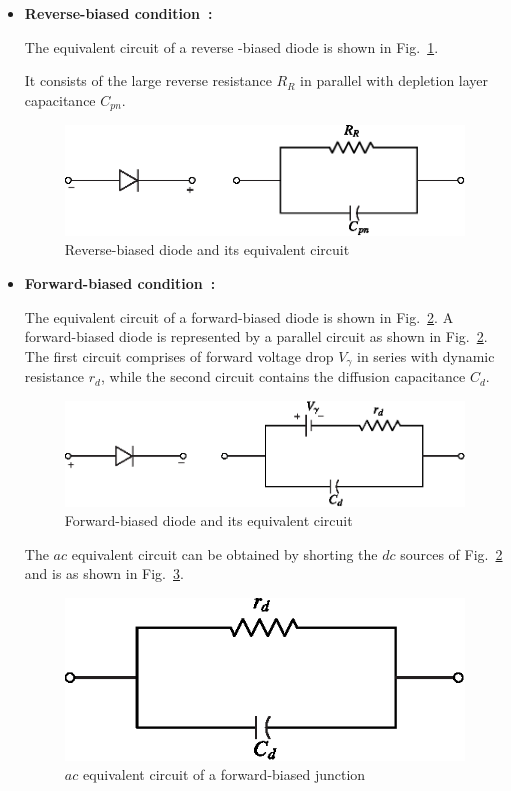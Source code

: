 \begin{itemize}
\item {\bf Reverse-biased condition~:}

The equivalent circuit of a reverse -biased diode is shown in
Fig.~\ref{fig1.18}.

It consists of the large reverse resistance $R_R$ in parallel with
depletion layer capacitance $C_{pn}$.
\begin{figure}[H]
\centering
\includegraphics{chap1/fig1.18.eps}
\caption{Reverse-biased diode and its equivalent circuit}\label{fig1.18}
\end{figure}

\item {\bf Forward-biased condition~:}

The equivalent circuit of a forward-biased diode is shown in
Fig.~\ref{fig1.19}. A forward-biased diode is represented by a parallel
circuit as shown in Fig.~\ref{fig1.19}. The first circuit comprises of forward
voltage drop $V_\gamma$ in series with dynamic resistance $r_d$, while
the second circuit contains the diffusion capacitance $C_d$.
\begin{figure}[H]
\centering
\includegraphics{chap1/fig1.19.eps}
\caption{Forward-biased diode and its equivalent circuit}\label{fig1.19}
\end{figure}

The $ac$ equivalent circuit can be obtained by shorting the $dc$
sources of Fig.~\ref{fig1.19} and is as shown in Fig.~\ref{fig1.20}.
\begin{figure}[H]
\centering
\includegraphics{chap1/fig1.20.eps}
\caption{$ac$ equivalent circuit of a forward-biased junction}\label{fig1.20}
\end{figure}
\end{itemize}

